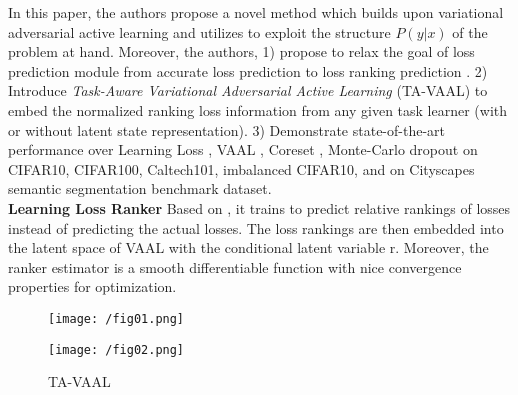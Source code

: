 \documentclass[12pt]{article}
\begin{document}
In this paper, the authors propose a novel method which builds upon
variational adversarial active learning \cite{VAAL} and utilizes
\cite{LearningLoss} to exploit the structure \(P(y|x)\) of the problem at hand.
Moreover, the authors, 1) propose to relax the goal of loss prediction module from
accurate loss prediction to loss ranking prediction \cite{RankCGAN}. 2) Introduce
\textit{Task-Aware Variational Adversarial Active Learning} (TA-VAAL) to embed
the normalized ranking loss information from any given task learner (with or
without latent state representation). 3) Demonstrate state-of-the-art
performance over Learning Loss \cite{LearningLoss}, VAAL \cite{VAAL}, Coreset
\cite{coreset}, Monte-Carlo dropout \cite{MonteCarloDropout} on CIFAR10, CIFAR100,
Caltech101, imbalanced CIFAR10, and on Cityscapes semantic segmentation
benchmark dataset.\\

\noindent
\textbf{Learning Loss Ranker}
Based on \cite{LearningLoss}, it trains to predict relative rankings
of losses instead of predicting the actual losses. The loss rankings are
then embedded into the latent space of VAAL with the conditional latent
variable r. Moreover, the ranker estimator is a smooth differentiable function
with nice convergence properties for optimization.

\begin{figure}[h]
  \centering
  \texttt{[image: /fig01.png]}
  \caption{}
\end{figure}

\begin{figure}[h]
  \centering
  \texttt{[image: /fig02.png]}
  \caption{TA-VAAL}
\end{figure}




\newpage



\end{document}
